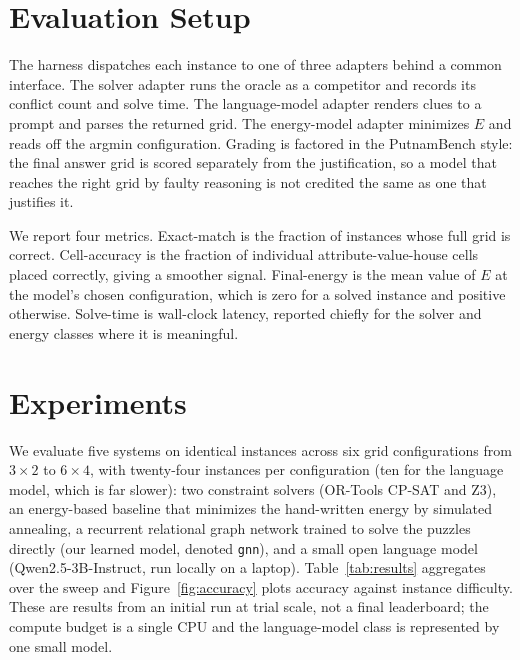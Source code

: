 \documentclass[11pt]{article}
\begin{document}
\section{Evaluation Setup}

The harness dispatches each instance to one of three adapters behind a common
interface. The solver adapter runs the oracle as a competitor and records its
conflict count and solve time. The language-model adapter renders clues to a
prompt and parses the returned grid. The energy-model adapter minimizes $E$ and
reads off the argmin configuration. Grading is factored in the PutnamBench style:
the final answer grid is scored separately from the justification, so a model that
reaches the right grid by faulty reasoning is not credited the same as one that
justifies it.

We report four metrics. Exact-match is the fraction of instances whose full grid
is correct. Cell-accuracy is the fraction of individual attribute-value-house
cells placed correctly, giving a smoother signal. Final-energy is the mean value
of $E$ at the model's chosen configuration, which is zero for a solved instance
and positive otherwise. Solve-time is wall-clock latency, reported chiefly for the
solver and energy classes where it is meaningful.

\section{Experiments}

We evaluate five systems on identical instances across six grid configurations
from $3\times2$ to $6\times4$, with twenty-four instances per configuration (ten
for the language model, which is far slower): two constraint solvers (OR-Tools
CP-SAT and Z3), an energy-based baseline that minimizes the hand-written energy by
simulated annealing, a recurrent relational graph network trained to solve the
puzzles directly (our learned model, denoted \texttt{gnn}), and a small open
language model (Qwen2.5-3B-Instruct, run locally on a laptop). Table~\ref{tab:results}
aggregates over the sweep and Figure~\ref{fig:accuracy} plots accuracy against
instance difficulty. These are results from an initial run at trial scale, not a
final leaderboard; the compute budget is a single CPU and the language-model class
is represented by one small model.
\end{document}
